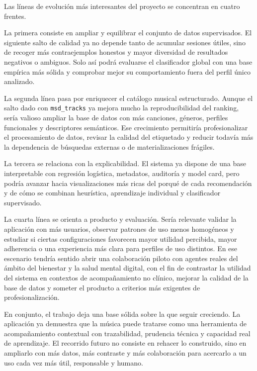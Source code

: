 Las líneas de evolución más interesantes del proyecto se concentran en cuatro
frentes.

La primera consiste en ampliar y equilibrar el conjunto de datos supervisados.
El siguiente salto de calidad ya no depende tanto de acumular sesiones útiles,
sino de recoger más contraejemplos honestos y mayor diversidad de resultados
negativos o ambiguos. Solo así podrá evaluarse el clasificador global con una
base empírica más sólida y comprobar mejor su comportamiento fuera del perfil
único analizado.

La segunda línea pasa por enriquecer el catálogo musical estructurado. Aunque
el salto dado con \texttt{msd\_tracks} ya mejora mucho la reproducibilidad del
ranking, sería valioso ampliar la base de datos con más canciones, géneros,
perfiles funcionales y descriptores semánticos. Ese crecimiento permitiría
profesionalizar el procesamiento de datos, revisar la calidad del etiquetado y
reducir todavía más la dependencia de búsquedas externas o de materializaciones
frágiles.

La tercera se relaciona con la explicabilidad. El sistema ya dispone de una
base interpretable con regresión logística, metadatos, auditoría y model
card, pero podría avanzar hacia visualizaciones más ricas del porqué de cada
recomendación y de cómo se combinan heurística, aprendizaje individual y
clasificador supervisado.

La cuarta línea se orienta a producto y evaluación. Sería relevante validar la
aplicación con más usuarios, observar patrones de uso menos homogéneos y
estudiar si ciertas configuraciones favorecen mayor utilidad percibida, mayor
adherencia o una experiencia más clara para perfiles de uso distintos. En ese
escenario tendría sentido abrir una colaboración piloto con agentes reales del
ámbito del bienestar y la salud mental digital, con el fin de contrastar la
utilidad del sistema en contextos de acompañamiento no clínico, mejorar la
calidad de la base de datos y someter el producto a criterios más exigentes de
profesionalización.

En conjunto, el trabajo deja una base sólida sobre la que seguir creciendo. La
aplicación ya demuestra que la música puede tratarse como una herramienta de
acompañamiento contextual con trazabilidad, prudencia técnica y capacidad real
de aprendizaje. El recorrido futuro no consiste en rehacer lo construido, sino
en ampliarlo con más datos, más contraste y más colaboración para acercarlo a
un uso cada vez más útil, responsable y humano.

